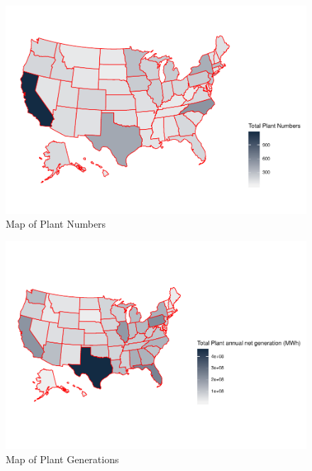 \documentclass[12pt,]{article}
\begin{document}
\begin{figure}
\centering
\includegraphics{Zhang_X_ENV872_Project_files/figure-latex/unnamed-chunk-10-1.pdf}
\caption{Map of Plant Numbers}
\end{figure}

\begin{figure}
\centering
\includegraphics{Zhang_X_ENV872_Project_files/figure-latex/unnamed-chunk-11-1.pdf}
\caption{Map of Plant Generations}
\end{figure}
\end{document}
